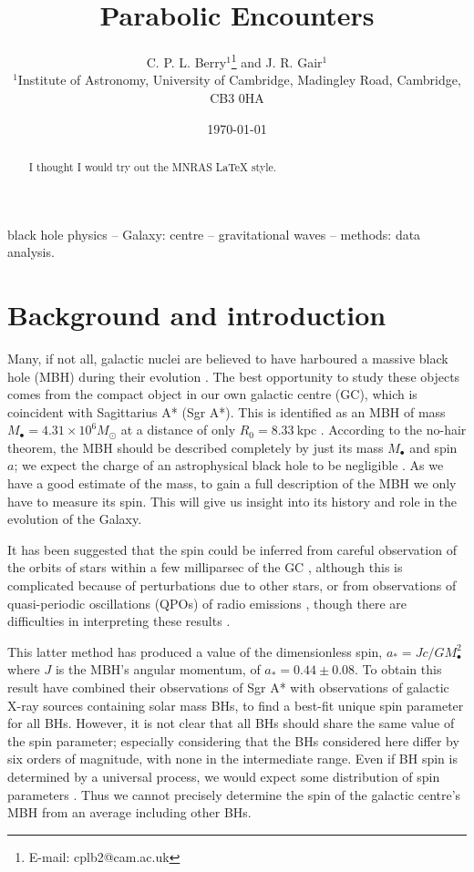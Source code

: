 \documentclass[useAMS,usedcolumn,usegraphicx,usenatbib]{mn2e}
\title[Parabolic Encounters]{Parabolic Encounters}
\author[C. P. L. Berry and J. R. Gair]{C. P. L. Berry$^{1}$\thanks{E-mail:
cplb2@cam.ac.uk}  and J. R. Gair$^{1}$\\
$^{1}$Institute of Astronomy, University of Cambridge, Madingley Road, Cambridge, CB3 0HA}
\newcommand{\units}[1]{\ensuremath{~\mathrm{#1}}}
\begin{document}
\date{\today}

\pagerange{\pageref{firstpage}--\pageref{lastpage}} 

\maketitle

\label{firstpage}

\begin{abstract}
I thought I would try out the MNRAS \LaTeX{} style.
\end{abstract}

\begin{keywords}
black hole physics -- Galaxy: centre -- gravitational waves -- methods: data analysis.
\end{keywords}

\section{Background and introduction}

Many, if not all, galactic nuclei  are believed to have harboured a massive black hole (MBH) during their evolution \citep{Lynden-Bell1971, Rees1984}. The best opportunity to study these objects comes from the compact object in our own galactic centre (GC), which is coincident with Sagittarius A* (Sgr A*). This is identified as an MBH of mass $M_\bullet = 4.31 \times 10^6 M_\odot$ at a distance of only $R_0 = 8.33\units{kpc}$ \citep{Gillessen2009}. According to the no-hair theorem, the MBH should be described completely by just its mass $M_\bullet$ and spin $a$; we expect the charge of an astrophysical black hole to be negligible \citep{Israel1967, Israel1968, Carter1971, Hawking1972, Robinson1975, Chandrasekhar1998}. As we have a good estimate of the mass, to gain a full description of the MBH we only have to measure its spin. This will give us insight into its history and role in the evolution of the Galaxy.

It has been suggested that the spin could be inferred from careful observation of the orbits of stars within a few milliparsec of the GC \citep{Merritt2010}, although this is complicated because of perturbations due to other stars, or from observations of quasi-periodic oscillations (QPOs) of radio emissions \citep{Kato2010}, though there are difficulties in interpreting these results \citep{Psaltis2008a}.

This latter method has produced a value of the dimensionless spin, $a_\ast = Jc/GM_\bullet^2$ where $J$ is the MBH's angular momentum, of $a_\ast = 0.44 \pm 0.08$. To obtain this result \citet{Kato2010} have combined their observations of Sgr A* with observations of galactic X-ray sources containing solar mass BHs, to find a best-fit unique spin parameter for all BHs. However, it is not clear that all BHs should share the same value of the spin parameter; especially considering that the BHs considered here differ by six orders of magnitude, with none in the intermediate range. Even if BH spin is determined by a universal process, we would expect some distribution of spin parameters \citep{King2008}. Thus we cannot precisely determine the spin of the galactic centre's MBH from an average including other BHs.
\end{document}
